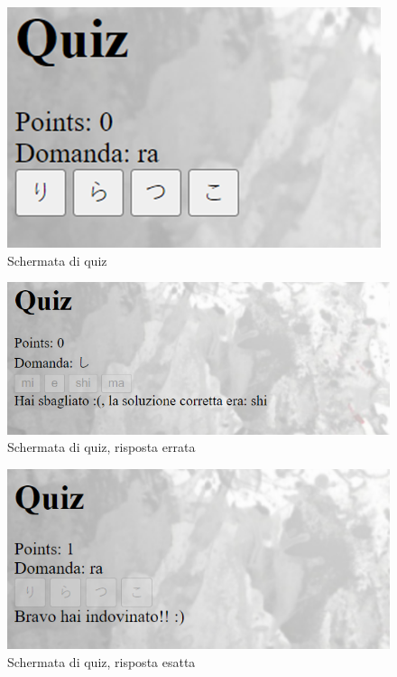 \begin{figure}[!h]
\centering
\includegraphics[scale=0.70]{images/quiz2.png}
\caption{Schermata di quiz}
\label{fig:user_flow_guest}
\end{figure}
\noindent


\begin{figure}[!h]
\centering
\includegraphics[scale=0.70]{images/quizErrato.png}
\caption{Schermata di quiz, risposta errata}
\label{fig:user_flow_guest}
\end{figure}
\noindent


\begin{figure}[!h]
\centering
\includegraphics[scale=0.70]{images/quizCorretto.png}
\caption{Schermata di quiz, risposta esatta}
\label{fig:user_flow_guest}
\end{figure}
\noindent


